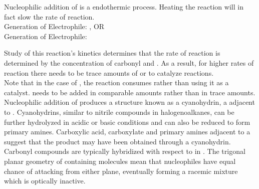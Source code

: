 \documentclass[../main]{subfiles}
\begin{document}
	Nucleophilic addition of  is a endothermic process. Heating the reaction will in fact slow the rate of reaction. \\

	Generation of Electrophile: , OR \\
	Generation of Electrophile:  \\


	Study of this reaction's kinetics determines that the rate of reaction is determined by the concentration of carbonyl and . As a result, for higher rates of reaction there needs to be trace amounts of  or  to catalyze reactions. \\

	Note that in the case of ,  the reaction consumes  rather than using it as a catalyst.  needs to be added in comparable amounts rather than in trace amounts. \\

	Nucleophilic addition of  produces a structure known as a cyanohydrin,  a  adjacent to . Cyanohydrins, similar to nitrile compounds in halogenoalkanes, can be further hydrolyzed in acidic or basic conditions and can also be reduced to form primary amines. Carboxylic acid, carboxylate and primary amines adjacent to a  suggest that the product may have been obtained through a cyanohydrin. \\

	Carbonyl compounds are typically  hybridized with respect to  in . The trigonal planar geometry of  containing molecules mean that nucleophiles have equal chance of attacking from either plane, eventually forming a racemic mixture which is optically inactive.
\end{document}
